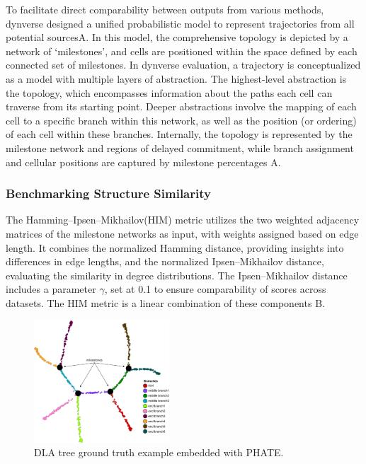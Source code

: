 To facilitate direct comparability between outputs from various methods, dynverse\citep{saelens2019comparison} designed a unified probabilistic model to represent trajectories from all potential sourcesA. In this model, the comprehensive topology is depicted by a network of `milestones', and cells are positioned within the space defined by each connected set of milestones. In dynverse evaluation, a trajectory is conceptualized as a model with multiple layers of abstraction. The highest-level abstraction is the topology, which encompasses information about the paths each cell can traverse from its starting point. Deeper abstractions involve the mapping of each cell to a specific branch within this network, as well as the position (or ordering) of each cell within these branches. Internally, the topology is represented by the milestone network and regions of delayed commitment, while branch assignment and cellular positions are captured by milestone percentages A.


\subsubsection{Benchmarking Structure Similarity}
The Hamming–Ipsen–Mikhailov(HIM) metric utilizes the two weighted adjacency matrices of the milestone networks as input, with weights assigned based on edge length. It combines the normalized Hamming distance, providing insights into differences in edge lengths, and the normalized Ipsen–Mikhailov distance, evaluating the similarity in degree distributions. The Ipsen–Mikhailov distance includes a parameter $\gamma$, set at 0.1 to ensure comparability of scores across datasets. The HIM metric is a linear combination of these components B.

\begin{figure}[!ht]
	\centering
	\includegraphics[width=0.45\textwidth]{DLA_example/fig}
	\vspace{0.1cm}
	\caption[DLA tree ground truth example]{DLA tree ground truth example embedded with PHATE.}
	\label{fig:DLA_example}
\end{figure}

